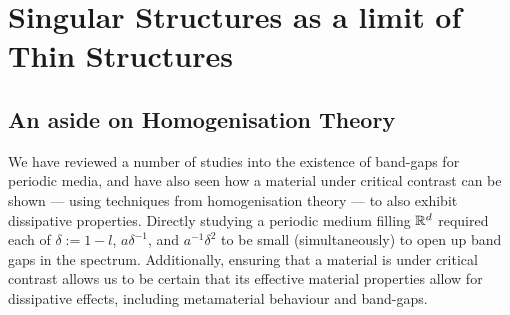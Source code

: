 \section{Singular Structures as a limit of Thin Structures} \label{sec:ConvToSS}

\subsection{An aside on Homogenisation Theory} \label{ssec:Intro-HomoTheory}

We have reviewed a number of studies into the existence of band-gaps for periodic media, and have also seen how a material under critical contrast can be shown --- using techniques from homogenisation theory --- to also exhibit dissipative properties.
Directly studying a periodic medium filling $\mathbb{R}^d$ required each of $\delta:=1-l$, $a\delta^{-1}$, and $a^{-1}\delta^2$ to be small (simultaneously) to open up band gaps in the spectrum.
Additionally, ensuring that a material is under critical contrast allows us to be certain that its effective material properties allow for dissipative effects, including metamaterial behaviour and band-gaps.

